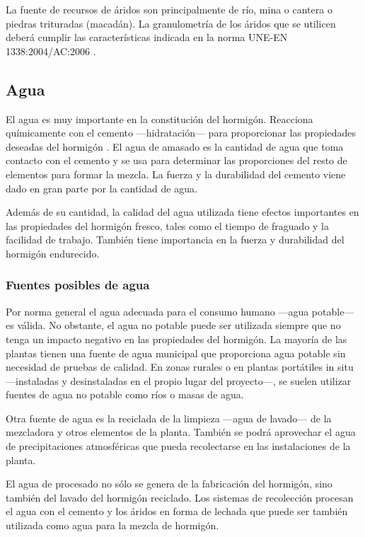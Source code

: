 La fuente de recursos de áridos son principalmente de río, mina o cantera o piedras trituradas (macadán). La granulometría de los áridos que se utilicen deberá cumplir las características indicada en la norma UNE-EN 1338:2004/AC:2006 \cite{une1338}.

\subsection{Agua}
El agua es muy importante en la constitución del hormigón. Reacciona químicamente con el cemento —hidratación— para proporcionar las propiedades deseadas del hormigón \cite{nrmca}. El agua de amasado es la cantidad de agua que toma contacto con el cemento y se usa para determinar las proporciones del resto de elementos para formar la mezcla. La fuerza y la durabilidad del cemento viene dado en gran parte por la cantidad de agua.

Además de su cantidad, la calidad del agua utilizada tiene efectos importantes en las propiedades del hormigón fresco, tales como el tiempo de fraguado y la facilidad de trabajo. También tiene importancia en la fuerza y durabilidad del hormigón endurecido.

\subsubsection{Fuentes posibles de agua}

Por norma general el agua adecuada para el consumo humano —agua potable— es válida. No obstante, el agua no potable puede ser utilizada siempre que no tenga un impacto negativo en las propiedades del hormigón. La mayoría de las plantas tienen una fuente de agua municipal que proporciona agua potable sin necesidad de pruebas de calidad. En zonas rurales o en plantas portátiles in situ —instaladas y desinstaladas en el propio lugar del proyecto—, se suelen utilizar fuentes de agua no potable como ríos o masas de agua.

Otra fuente de agua es la reciclada de la limpieza —agua de lavado— de la mezcladora y otros elementos de la planta. También se podrá aprovechar el agua de precipitaciones atmosféricas que pueda recolectarse en las instalaciones de la planta.

El agua de procesado no sólo se genera de la fabricación del hormigón, sino también del lavado del hormigón reciclado. Los sistemas de recolección procesan el agua con el cemento y los áridos en forma de lechada que puede ser también utilizada como agua para la mezcla de hormigón.

